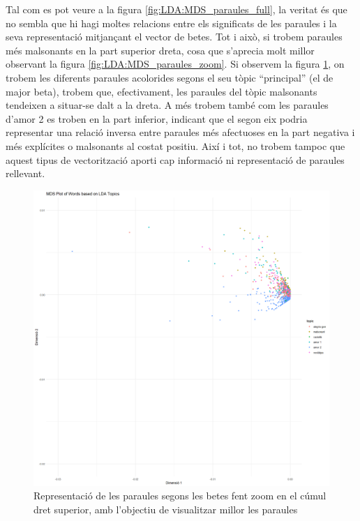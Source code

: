 Tal com es pot veure a la figura \ref{fig:LDA:MDS_paraules_full}, la veritat és que no sembla que hi hagi moltes relacions entre els significats de les paraules i la seva representació mitjançant el vector de betes. Tot i això, si trobem paraules més malsonants en la part superior dreta, cosa que s'aprecia molt millor observant la figura \ref{fig:LDA:MDS_paraules_zoom}. Si observem la figura \ref{fig:LDA:MDS_paraules_topic}, on trobem les diferents paraules acolorides segons el seu tòpic ``principal'' (el de major beta), trobem que, efectivament, les paraules del tòpic malsonants tendeixen a situar-se dalt a la dreta. A més trobem també com les paraules d'amor 2 es troben en la part inferior, indicant que el segon eix podria representar una relació inversa entre paraules més afectuoses en la part negativa i més explícites o malsonants al costat positiu. Així i tot, no trobem tampoc que aquest tipus de vectorització aporti cap informació ni representació de paraules rellevant.

\begin{figure}[H]
    \centering
    \includegraphics[width=0.95\linewidth]{Images/8_Textual/LDA/MDS_paraules_topic.png}
    \caption{Representació de les paraules segons les betes fent zoom en el cúmul dret superior, amb l'objectiu de visualitzar millor les paraules}
    \label{fig:LDA:MDS_paraules_topic}
\end{figure}

